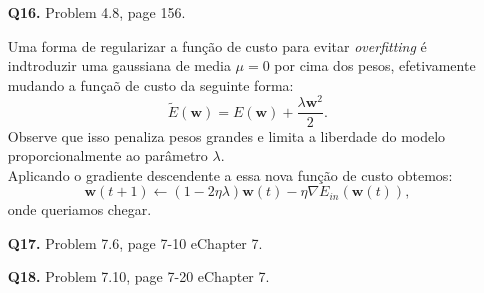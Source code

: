 \documentclass[12pt]{article}
\begin{document}
\begin{enumerate}
\begin{addmargin}[1em]{2em}
\begin{align*}
		\end{align*}
		\begin{itemize}
			\item[a)] Queremos $\nabla E_{in}(\mathbf{w}) = 0$, então, da expressão acima o valor de \textbf{w} que minimiza $E_{in}$ é $\mathbf{w_{lin}}$.
			\item[b)] O menor $E_{in}$ ocorre quando $\mathbf{w_{lin}} = (Z^TZ)^{-1}Z^Ty$.
		\end{itemize}
	\end{addmargin}
\item [\textbf{Q16.}] Problem 4.8, page 156.
	\begin{addmargin}[1em]{2em}
		Uma forma de regularizar a função de custo para evitar \textit{overfitting} é indtroduzir uma gaussiana de media $\mu = 0$ por cima dos pesos, efetivamente mudando a funçaõ de custo da seguinte forma: \[\tilde{E}(\mathbf{w}) = E(\mathbf{w}) + \frac{\lambda \mathbf{w}^2}{2}.\]
		Observe que isso penaliza pesos grandes e limita a liberdade do modelo proporcionalmente ao parâmetro $\lambda$.\\
		Aplicando o gradiente descendente a essa nova função de custo obtemos: \[\mathbf{w}(t+1) \leftarrow (1-2\eta \lambda)\mathbf{w}(t) - \eta \nabla E_{in}(\mathbf{w}(t)),\]
		onde queriamos chegar.
	\end{addmargin}
\item [\textbf{Q17.}] Problem 7.6, page 7-10 eChapter 7.

\item [\textbf{Q18.}] Problem 7.10, page 7-20 eChapter 7.
\end{enumerate}
\end{document}
